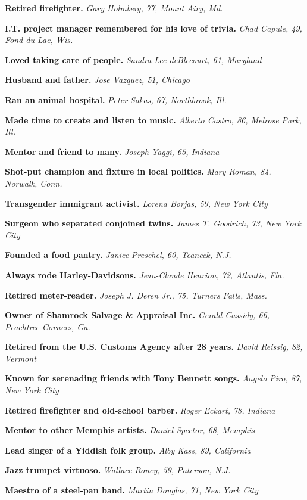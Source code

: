 \textbf{Retired firefighter.} \emph{Gary Holmberg, 77, Mount Airy, Md.}

\textbf{I.T. project manager remembered for his love of trivia.}
\emph{Chad Capule, 49, Fond du Lac, Wis.}

\textbf{Loved taking care of people.} \emph{Sandra Lee deBlecourt, 61,
Maryland}

\textbf{Husband and father.} \emph{Jose Vazquez, 51, Chicago}

\textbf{Ran an animal hospital.} \emph{Peter Sakas, 67, Northbrook,
Ill.}

\textbf{Made time to create and listen to music.} \emph{Alberto Castro,
86, Melrose Park, Ill.}

\textbf{Mentor and friend to many.} \emph{Joseph Yaggi, 65, Indiana}

\textbf{Shot-put champion and fixture in local politics.} \emph{Mary
Roman, 84, Norwalk, Conn.}

\textbf{Transgender immigrant activist.} \emph{Lorena Borjas, 59, New
York City}

\textbf{Surgeon who separated conjoined twins.} \emph{James T. Goodrich,
73, New York City}

\textbf{Founded a food pantry.} \emph{Janice Preschel, 60, Teaneck,
N.J.}

\textbf{Always rode Harley-Davidsons.} \emph{Jean-Claude Henrion, 72,
Atlantis, Fla.}

\textbf{Retired meter-reader.} \emph{Joseph J. Deren Jr., 75, Turners
Falls, Mass.}

\textbf{Owner of Shamrock Salvage \& Appraisal Inc.} \emph{Gerald
Cassidy, 66, Peachtree Corners, Ga.}

\textbf{Retired from the U.S. Customs Agency after 28 years.}
\emph{David Reissig, 82, Vermont}

\textbf{Known for serenading friends with Tony Bennett songs.}
\emph{Angelo Piro, 87, New York City}

\textbf{Retired firefighter and old-school barber.} \emph{Roger Eckart,
78, Indiana}

\textbf{Mentor to other Memphis artists.} \emph{Daniel Spector, 68,
Memphis}

\textbf{Lead singer of a Yiddish folk group.} \emph{Alby Kass, 89,
California}

\textbf{Jazz trumpet virtuoso.} \emph{Wallace Roney, 59, Paterson, N.J.}

\textbf{Maestro of a steel-pan band.} \emph{Martin Douglas, 71, New York
City}

